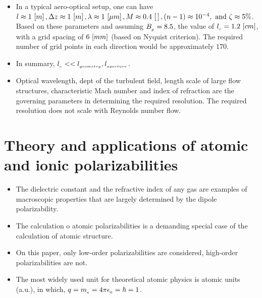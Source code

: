 \begin{itemize}
            \item In a typical aero-optical setup, one can have $l\approx 1\,\left[m\right], \Delta z\approx 1\,\left[m\right], \lambda\approx 1\,\left[\mu m\right], M\approx 0.4\,\left[\,\right], \left(n-1\right) \approx 10^{-4},\text{ and } \zeta\approx 5\%$. Based on these parameters and assuming $B_{_{p}} = 8.5$, the value of $l_{_{c}} = 1.2\,\left[cm\right]$, with a grid spacing of $6\,\left[mm\right]$ (based on Nyquist criterion). The required number of grid points in each direction would be approximately $170$. 
            \item In summary, $l_{_{c}} << l_{_{geometry}}, l_{_{aperture}} $. 
            \item Optical wavelength, dept of the turbulent field, length scale of large flow structures, characteristic Mach number and index of refraction are the governing parameters in determining the required resolution. The required resolution does not scale with Reynolds number flow.
         \end{itemize}
         

    \section{Theory and applications of atomic and ionic polarizabilities \cite{mitroy:jop:2010}}
        \begin{itemize}
            \item The dielectric constant and the refractive index of any gas are examples of macroscopic properties that are largely determined by the dipole polarizability.
            \item The calculation o atomic polarizabilities is a demanding special case of the calculation of atomic structure. 
            \item On this paper, only low-order polarizabilities are considered, high-order polarizabilities are not. 
            \item The most widely used unit for theoretical atomic physics is atomic units (a.u.), in which, $q=m_{_{e}}=4\pi\epsilon_{_{0}}=\hbar=1$.  
        \end{itemize} 
\fi 

\iftrue 

